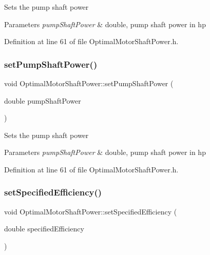 Sets the pump shaft power 
\begin{DoxyParams}{Parameters}
{\em pump\+Shaft\+Power} & double, pump shaft power in hp \\
\hline
\end{DoxyParams}


Definition at line 61 of file Optimal\+Motor\+Shaft\+Power.\+h.

\mbox{\label{class_optimal_motor_shaft_power_ab2d80927fbaa62705359700b2a8f2f26}} 
\subsubsection{\texorpdfstring{set\+Pump\+Shaft\+Power()}{setPumpShaftPower()}\hspace{0.1cm}{\footnotesize\ttfamily [3/3]}}
{\footnotesize\ttfamily void Optimal\+Motor\+Shaft\+Power\+::set\+Pump\+Shaft\+Power (\begin{DoxyParamCaption}\item[{double}]{pump\+Shaft\+Power }\end{DoxyParamCaption})\hspace{0.3cm}{\ttfamily [inline]}}

Sets the pump shaft power 
\begin{DoxyParams}{Parameters}
{\em pump\+Shaft\+Power} & double, pump shaft power in hp \\
\hline
\end{DoxyParams}


Definition at line 61 of file Optimal\+Motor\+Shaft\+Power.\+h.

\mbox{\label{class_optimal_motor_shaft_power_a92f7da022e380abbd8cfd308e8aa5e58}} 
\subsubsection{\texorpdfstring{set\+Specified\+Efficiency()}{setSpecifiedEfficiency()}\hspace{0.1cm}{\footnotesize\ttfamily [1/3]}}
{\footnotesize\ttfamily void Optimal\+Motor\+Shaft\+Power\+::set\+Specified\+Efficiency (\begin{DoxyParamCaption}\item[{double}]{specified\+Efficiency }\end{DoxyParamCaption})\hspace{0.3cm}{\ttfamily [inline]}}

